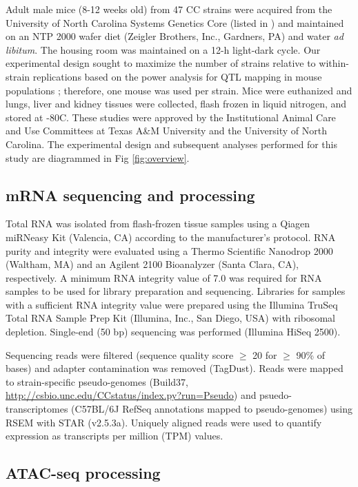 \documentclass[10pt,letterpaper]{article}
\begin{document}
Adult male mice (8-12 weeks old) from 47 CC strains were acquired from the University of North Carolina Systems Genetics Core (listed in ) and maintained on an NTP 2000 wafer diet (Zeigler Brothers, Inc., Gardners, PA) and water \textit{ad libitum}. The housing room was maintained on a 12-h light-dark cycle. Our experimental design sought to maximize the number of strains relative to within-strain replications based on the power analysis for QTL mapping in mouse populations \cite{Kaeppler1997}; therefore, one mouse was used per strain. Mice were euthanized and lungs, liver and kidney tissues were collected, flash frozen in liquid nitrogen, and stored at -80\degree C. These studies were approved by the Institutional Animal Care and Use Committees at Texas A\&M University and the University of North Carolina. The experimental design and subsequent analyses performed for this study are diagrammed in Fig \ref{fig:overview}.


\subsection*{mRNA sequencing and processing}

Total RNA was isolated from flash-frozen tissue samples using a Qiagen miRNeasy Kit (Valencia, CA) according to the manufacturer’s protocol. RNA purity and integrity were evaluated using a Thermo Scientific Nanodrop 2000 (Waltham, MA) and an Agilent 2100 Bioanalyzer (Santa Clara, CA), respectively. A minimum RNA integrity value of 7.0 was required for RNA samples to be used for library preparation and sequencing. Libraries for samples with a sufficient RNA integrity value were prepared using the Illumina TruSeq Total RNA Sample Prep Kit (Illumina, Inc., San Diego, USA) with ribosomal depletion. Single-end (50 bp) sequencing was performed (Illumina HiSeq 2500).

Sequencing reads were filtered (sequence quality score $\ge$ 20 for $\ge$ 90\% of bases) and adapter contamination was removed (TagDust). Reads were mapped to strain-specific pseudo-genomes (Build37, \url{http://csbio.unc.edu/CCstatus/index.py?run=Pseudo}) and psuedo-transcriptomes (C57BL/6J RefSeq annotations mapped to pseudo-genomes) using RSEM with STAR (v2.5.3a). Uniquely aligned reads  were used to quantify expression as transcripts per million (TPM) values.

\subsection*{ATAC-seq processing}
\end{document}
